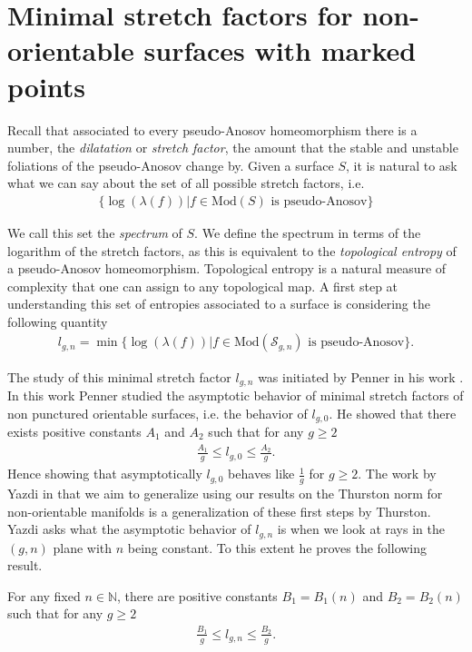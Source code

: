 \section{Minimal stretch factors for non-orientable surfaces with marked points}
\label{sec:application}

Recall that associated to every pseudo-Anosov homeomorphism there is a number, the \textit{dilatation} or \textit{stretch factor}, the amount that the stable and unstable foliations of the pseudo-Anosov change by. Given a surface $S$, it is natural to ask what we can say about the set of all possible stretch factors, i.e.
\begin{align*}
    \{\log(\lambda(f)) | f \in \text{Mod}(S) \text{ is pseudo-Anosov}\}
\end{align*}

We call this set the \textit{spectrum} of $S$. We define the spectrum in terms of the logarithm of the stretch factors, as this is equivalent to the \textit{topological entropy} of a pseudo-Anosov homeomorphism. Topological entropy is a natural measure of complexity that one can assign to any topological map. A first step at understanding this set of entropies associated to a surface is considering the following quantity
\begin{align*}
    l_{g,n} =\min\{\log(\lambda(f)) | f \in \text{Mod}(\mathcal{S}_{g,n}) \text{ is pseudo-Anosov}\}.
\end{align*}

The study of this minimal stretch factor $l_{g,n}$ was initiated by Penner in his work \cite{penner1991bounds}. In this work Penner studied the asymptotic behavior of minimal stretch factors of non punctured orientable surfaces, i.e. the behavior of $l_{g,0}$. He showed that there exists positive constants $A_1$ and $A_2$ such that for any $g \geq 2$
\begin{align*}
    \frac{A_1}{g} \leq l_{g,0} \leq \frac{A_2}{g}.
\end{align*}
Hence showing that asymptotically $l_{g,0}$ behaves like $\frac{1}{g}$ for $g \geq 2$. The work by Yazdi in \cite{yazdi2018pseudo} that we aim to generalize using our results on the Thurston norm for non-orientable manifolds is a generalization of these first steps by Thurston. Yazdi asks what the asymptotic behavior of $l_{g,n}$ is when we look at rays in the $(g,n)$ plane with $n$ being constant. To this extent he proves the following result.                               
\begin{thm}[Yazdi]
\label{thm:yazdi1}
For any fixed $n \in \mathbb{N}$, there are positive constants $B_1 = B_1(n)$ and $B_2 = B_2(n)$ such that for any $g \geq 2$ 
\begin{align*}
    \frac{B_1}{g} \leq l_{g,n} \leq \frac{B_2}{g}.
\end{align*}
\end{thm}

